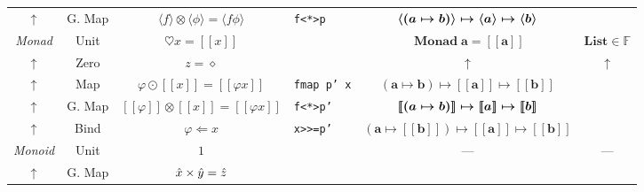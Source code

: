 \documentclass{jsarticle}
\def\[{[\![}
\def\]{]\!]}
\newcommand{\boldsym}[1]{{\boldsymbol{#1}}}
\begin{document}
\begin{center}
\begin{tabular}{||c|c||c|l|c|c||}
    &\\
    \hline
$\uparrow$
    &G. Map
    &$\langle f\rangle\otimes\langle\phi\rangle=\langle f\phi\rangle$
    &\texttt{f<*>p}
    &$\boldsym{\langle}(\boldmath{a}\mapsto\boldmath{b})\boldsym{\rangle}\mapsto\boldsym{\langle a\rangle}\mapsto\boldsym{\langle b\rangle}$
    &\\
    \hline
    \hline
\textsl{Monad}
    &Unit
    &$\heartsuit x=\[x\]$
    &
    &$\mathop{\textbf{Monad}}\mathbf{a}=\boldsym{\[a\]}$
    &$\textbf{List}\in\mathbb{F}$\\
    \hline
$\uparrow$
    &Zero
    &$z=\diamond$
    &
    &$\uparrow$
    &$\uparrow$\\
    \hline
$\uparrow$
    &Map
    &$\varphi\odot\[x\]=\[\varphi x\]$
    &\texttt{fmap p' x}
    &$(\mathbf{a}\mapsto\mathbf{b})\mapsto\boldsym{\[a\]}\mapsto\boldsym{\[b\]}$
    &\\
    \hline
$\uparrow$
    &G. Map
    &$\[\varphi\]\otimes\[x\]=\[\varphi x\]$
    &\texttt{f<*>p'}
    &$\boldsym{\[}(\boldmath{a}\mapsto\boldmath{b})\boldsym{\]}\mapsto\boldsym{\[a\]}\mapsto\boldsym{\[b\]}$
    &\\
    \hline
$\uparrow$
    &Bind
    &$\varphi\Leftarrow x$
    &\texttt{x>>=p'}
    &$(\mathbf{a}\mapsto\boldsym{\[b\]})\mapsto\boldsym{\[a\]}\mapsto\boldsym{\[b\]}$
    &\\
    \hline
    \hline
\textsl{Monoid}
    &Unit
    &$1$
    &
    &---
    &---\\
    \hline
$\uparrow$
    &G. Map
    &$\Hat{x}\times\Hat{y}=\Hat{z}$
    &
    &
    &\\
    \hline
\end{tabular}
\end{center}
\end{document}
